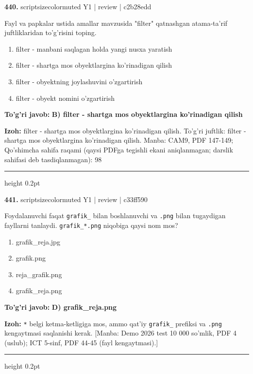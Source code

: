 \documentclass[10pt,a4paper]{article}
\begin{document}
{\bfseries\sffamily\color{ink} 440.} {scriptsizecolor{muted} Y1 | review | c2b28edd}
\par
Fayl va papkalar ustida amallar mavzusida "filter" qatnashgan atama-ta'rif juftliklaridan to'g'risini toping.
\begin{enumerate}[label=\Alph*),leftmargin=9mm]
\item filter - manbani saqlagan holda yangi nusxa yaratish
\item filter - shartga mos obyektlargina ko'rinadigan qilish
\item filter - obyektning joylashuvini o'zgartirish
\item filter - obyekt nomini o'zgartirish
\end{enumerate}
\begin{tcolorbox}[enhanced,breakable,colback=teal!4,colframe=teal!60!black,boxrule=0.45pt,arc=1.2mm,left=2.7mm,right=2.7mm,top=1.8mm,bottom=1.8mm,before skip=2mm,after skip=2mm]
{\bfseries\sffamily\color{teal}To'g'ri javob:} \textbf{B) filter - shartga mos obyektlargina ko'rinadigan qilish}
\par\smallskip
{\bfseries Izoh:} filter - shartga mos obyektlargina ko'rinadigan qilish. To'g'ri juftlik: filter - shartga mos obyektlargina ko'rinadigan qilish. Manba: CAM9, PDF 147-149; Qo'shimcha sahifa raqami (qaysi PDFga tegishli ekani aniqlanmagan; darslik sahifasi deb tasdiqlanmagan): 98
\end{tcolorbox}
\vspace{2mm}\hrule height 0.2pt\vspace{3mm}

{\bfseries\sffamily\color{ink} 441.} {scriptsizecolor{muted} Y1 | review | c33ff590}
\par
Foydalanuvchi faqat \texttt{grafik\_} bilan boshlanuvchi va \texttt{.png} bilan tugaydigan fayllarni tanlaydi. \texttt{grafik\_*.png} niqobiga qaysi nom mos?
\begin{enumerate}[label=\Alph*),leftmargin=9mm]
\item grafik\_reja.jpg
\item grafik.png
\item reja\_grafik.png
\item grafik\_reja.png
\end{enumerate}
\begin{tcolorbox}[enhanced,breakable,colback=teal!4,colframe=teal!60!black,boxrule=0.45pt,arc=1.2mm,left=2.7mm,right=2.7mm,top=1.8mm,bottom=1.8mm,before skip=2mm,after skip=2mm]
{\bfseries\sffamily\color{teal}To'g'ri javob:} \textbf{D) grafik\_reja.png}
\par\smallskip
{\bfseries Izoh:} \texttt{*} belgi ketma-ketligiga mos, ammo qat'iy \texttt{grafik\_} prefiksi va \texttt{.png} kengaytmasi saqlanishi kerak. [Manba: Demo 2026 test 10 000 so'mlik, PDF 4 (uslub); ICT 5-sinf, PDF 44-45 (fayl kengaytmasi).]
\end{tcolorbox}
\vspace{2mm}\hrule height 0.2pt\vspace{3mm}
\end{document}
